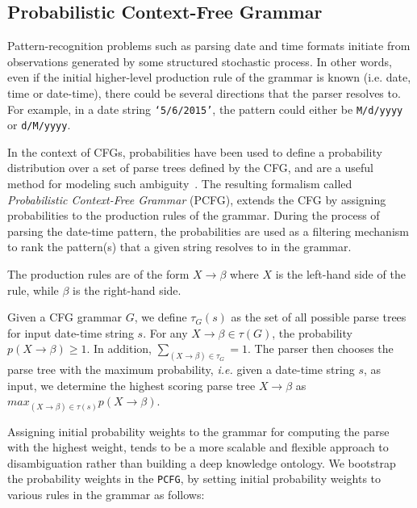 \subsection{Probabilistic Context-Free Grammar}


Pattern-recognition problems such as parsing date and time formats initiate from observations generated by some structured stochastic process. In other words, even if the initial higher-level production rule of the grammar is known (i.e. date, time or date-time), there could be several directions that the parser resolves to. For example, in a date string \texttt{`5/6/2015'}, the pattern could either be \texttt{M/d/yyyy} or \texttt{d/M/yyyy}. 

In the context of CFGs, probabilities have been used to define a probability distribution over a set of parse trees defined by the CFG, and are a useful method for modeling such ambiguity~\cite{Collins:2003,Manning:1999}. The resulting formalism called \textit{Probabilistic Context-Free Grammar} (PCFG), extends the CFG by assigning probabilities to the production rules of the grammar. During the process of parsing the date-time pattern, the probabilities are used as a filtering mechanism to rank the pattern(s) that a given string resolves to in the grammar. 

The production rules are of the form $ X \rightarrow \beta$ where $X$ is the left-hand side of the rule, while $\beta$ is the right-hand side.

Given a CFG grammar $G$, we define  $\tau_G(s)$ as the set of all possible parse trees for input date-time string $s$.  For any $X \rightarrow \beta \in \tau(G)$, the probability $p(X \rightarrow \beta) \ge 1$. In addition, $\sum_{(X \rightarrow \beta) \in \tau_{G}} = 1$. The parser then chooses the parse tree with the maximum probability, \textit{i.e.} given a date-time string $s$, as input, we determine the highest scoring parse tree $X \rightarrow \beta$ as  $max_{(X \rightarrow \beta) \in \tau(s)} p(X \rightarrow \beta)$.


Assigning initial probability weights to the grammar for computing the parse with the highest weight, tends to be a more scalable and flexible approach to disambiguation rather than building a deep knowledge ontology. We bootstrap the probability weights in the \texttt{PCFG}, by setting initial probability weights to various rules in the grammar as follows:

